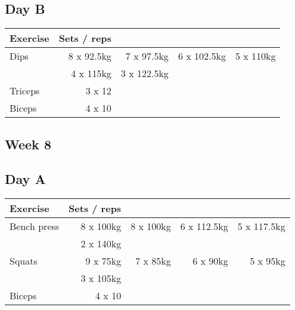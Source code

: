 \documentclass[12pt, a4paper]{article}%
\begin{document}
  \subsection*{\hspace{0.5em} Day B }


  \begin{tabular}{l|rrrr}
  \hspace{0.75em} \textbf{Exercise} & \textbf{Sets / reps} \\ \hline

            \hspace{0.75em} Dips
            & 8 x 92.5kg
            & 7 x 97.5kg
            & 6 x 102.5kg
            & 5 x 110kg
            \\


            \hspace{0.75em}
            & 4 x 115kg
            & 3 x 122.5kg
            & 
            & 
            \\


   \hspace{0.75em} Triceps & 3 x 12 \\
   \hspace{0.75em} Biceps & 4 x 10 \\
  \end{tabular}

 \subsection*{\hspace{0.25em} Week 8 }
  \subsection*{\hspace{0.5em} Day A }


  \begin{tabular}{l|rrrr}
  \hspace{0.75em} \textbf{Exercise} & \textbf{Sets / reps} \\ \hline

            \hspace{0.75em} Bench press
            & 8 x 100kg
            & 8 x 100kg
            & 6 x 112.5kg
            & 5 x 117.5kg
            \\


            \hspace{0.75em}
            & 2 x 140kg
            & 
            & 
            & 
            \\


            \hspace{0.75em} Squats
            & 9 x 75kg
            & 7 x 85kg
            & 6 x 90kg
            & 5 x 95kg
            \\


            \hspace{0.75em}
            & 3 x 105kg
            & 
            & 
            & 
            \\


   \hspace{0.75em} Biceps & 4 x 10 \\
  \end{tabular}
\end{document}
